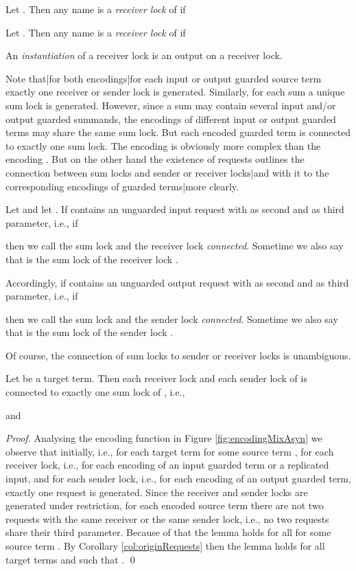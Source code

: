 \documentclass[]{llncs}
\begin{document}
\begin{definition} \label{def:receiverLock}
	Let . Then any name  is a \emph{receiver lock} of  if
	
	Let . Then any name  is a \emph{receiver lock} of  if
	
	An \emph{instantiation} of a receiver lock is an output on a receiver lock.
\end{definition}

Note that|for both encodings|for each input or output guarded source term exactly one receiver or sender lock is generated. Similarly, for each sum a unique sum lock is generated. However, since a sum may contain several input and/or output guarded summands, the encodings of different input or output guarded terms may share the same sum lock. But each encoded guarded term is connected to exactly one sum lock. The encoding  is obviously more complex than the encoding . But on the other hand the existence of requests outlines the connection between sum locks and sender or receiver locks|and with it to the corresponding encodings of guarded terms|more clearly.

\begin{definition} \label{def:connectionSumLockSenderReceiver}
	Let  and let . If  contains an unguarded input request with  as second and  as third parameter, i.e., if
	
	then we call the sum lock  and the receiver lock  \emph{connected}. Sometime we also say that  is the sum lock of the receiver lock .
	
	Accordingly, if  contains an unguarded output request with  as second and  as third parameter, i.e., if
	
	then we call the sum lock  and the sender lock  \emph{connected}. Sometime we also say that  is the sum lock of the sender lock .
\end{definition}

Of course, the connection of sum locks to sender or receiver locks is unambiguous.

\begin{lemma} \label{lem:sumLockOfReceiverOrSender}
	Let  be a target term. Then each receiver lock  and each sender lock  of  is connected to exactly one sum lock  of , i.e.,
	
	and
	
\end{lemma}

\begin{proof}
	Analysing the encoding function  in Figure \ref{fig:encodingMixAsyn} we observe that initially, i.e., for each target term  for some source term , for each receiver lock, i.e., for each encoding of an input guarded term or a replicated input, and for each sender lock, i.e., for each encoding of an output guarded term, exactly one request is generated. Since the receiver and sender locks are generated under restriction, for each encoded source term there are not two requests with the same receiver or the same sender lock, i.e., no two requests share their third parameter. Because of that the lemma holds for all  for some source term . By Corollary \ref{col:originRequests} then the lemma holds for all target terms  and  such that .
	\qed
\end{proof}
\end{document}
